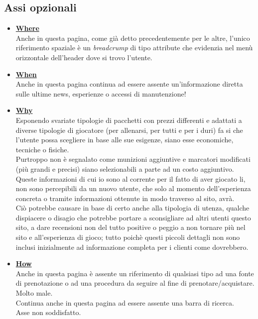 \documentclass[../Relazione.tex]{subfiles}
\begin{document}
    \subsection{Assi opzionali}
        \vspace*{0,5cm}
        \begin{itemize}
            \item \textbf{\underline{Where}}
            \vspace*{5mm}\\Anche in questa pagina, come già detto precedentemente per le altre, l'unico riferimento spaziale è un \emph{breadcrump} di tipo attribute che evidenzia nel menù orizzontale dell'header dove si trovo l'utente.
            \item \textbf{\underline{When}}
            \vspace*{5mm}\\Anche in questa pagina continua ad essere assente un'informazione diretta sulle ultime news, esperienze o accessi di manutenzione!
            \item \textbf{\underline{Why}}
            \vspace*{5mm}\\Esponendo svariate tipologie di pacchetti con prezzi differenti e adattati a diverse tipologie di giocatore (per allenarsi, per tutti e per i duri) fa si che l'utente possa scegliere in base alle sue esigenze, siano esse economiche, tecniche o fisiche.\\
            Purtroppo non è segnalato come munizioni aggiuntive e marcatori modificati (più grandi e precisi) siano selezionabili a parte ad un costo aggiuntivo.\\
            Queste informazioni di cui io sono al corrente per il fatto di aver giocato li, non sono percepibili da un nuovo utente, che solo al momento dell'esperienza concreta o tramite informazioni ottenute in modo traverso al sito, avrà.\\
            Ciò potrebbe causare in base di certo anche alla tipologia di utenza, qualche dispiacere o disagio che potrebbe portare a sconsigliare ad altri utenti questo sito, a dare recensioni non del tutto positive o peggio a non tornare più nel sito e all'esperienza di gioco; tutto poichè questi piccoli dettagli non sono inclusi inizialmente ad informazione completa per i clienti come dovrebbero.\\
            \item \textbf{\underline{How}}
            \vspace*{5mm}\\Anche in questa pagina è assente un riferimento di qualsiasi tipo ad una fonte di prenotazione o ad una procedura da seguire al fine di prenotare/acquistare. Molto male.\\
            Continua anche in questa pagina ad essere assente una barra di ricerca.\\
            Asse non soddisfatto.

        \end{itemize}
   
\end{document}

